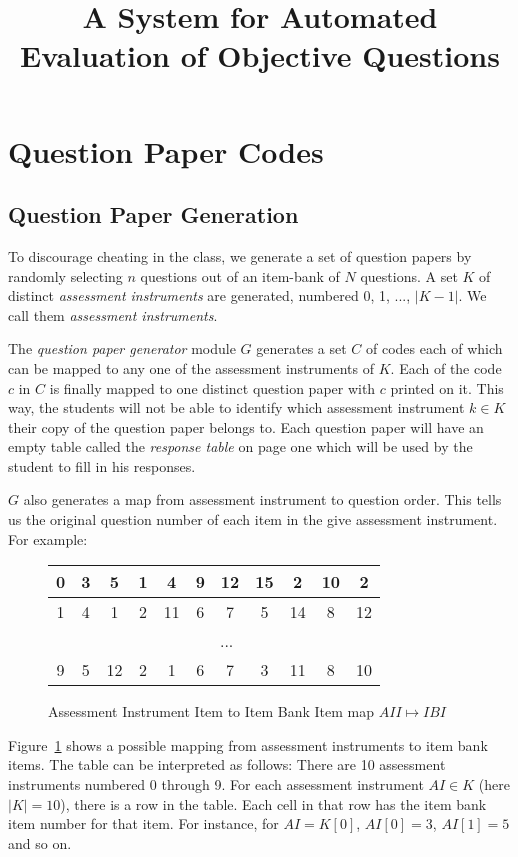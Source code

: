 \documentclass[12pt]{article}
\title{A System for Automated Evaluation of Objective Questions}
\begin{document}
\section{Question Paper Codes}

\subsection{Question Paper Generation}
To discourage cheating in the class, we generate a set of question papers by randomly selecting $n$ questions out of an item-bank of $N$ questions. A set $K$ of distinct \emph{assessment instruments} are generated, numbered 0, 1, ..., $|K-1|$. We call them \emph{assessment instruments}.

The \emph{question paper generator} module $G$ generates a set $C$ of codes each of which can be mapped to any one of the assessment instruments of $K$. Each of the code $c$ in $C$ is finally mapped to one distinct question paper with $c$ printed on it. This way, the students will not be able to identify which assessment instrument $k \in K$ their copy of the question paper belongs to. Each question paper will have an empty table called the \emph{response table} on page one which will be used by the student to fill in his responses.

$G$ also generates a map from assessment instrument to question order. This tells us the original question number of each item in the give assessment instrument. For example:
\begin{figure}

\begin{center}
\begin{tabular}{|c|c|c|c|c|c|c|c|c|c|c|}
\hline
\cellcolor{Gray}0 & 3 & 5 & 1 & 4 & 9 & 12 & 15 & 2 & 10 & 2 \\
\hline
\cellcolor{Gray}1 & 4 & 1 & 2 & 11 & 6 & 7 & 5 & 14 & 8 & 12 \\
\hline
& \multicolumn{10}{|c|}{...} \\
\hline
\cellcolor{Gray}9 & 5 & 12 & 2 & 1 & 6 & 7 & 3 & 11 & 8 & 10 \\
\hline
\end{tabular}
\end{center}

\caption{Assessment Instrument Item to Item Bank Item map $AII \mapsto IBI$}
\label{f:aiiibi} 
\end{figure}

Figure~\ref{f:aiiibi} shows a possible mapping from assessment instruments to item bank items. The table can be interpreted as follows: There are 10 assessment instruments numbered 0 through 9. For each assessment instrument $AI \in K$ (here $|K| = 10$), there is a row in the table. Each cell in that row has the item bank item number for that item. For instance, for $AI = K[0]$, $AI[0] = 3$, $AI[1] = 5$ and so on.
  
\end{document}
